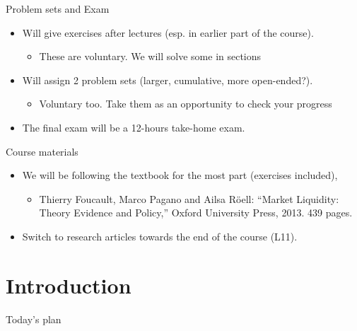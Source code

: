 \documentclass[english,10pt
,aspectratio=169
]{beamer}
\begin{document}
\begin{frame}{Problem sets and Exam}
\begin{itemize}
	\item Will give exercises after lectures (esp. in earlier part of the course).
	\begin{itemize}
		\item These are voluntary. We will solve some in sections
	\end{itemize}
	\item Will assign 2 problem sets (larger, cumulative, more open-ended?).
	\begin{itemize}
		\item Voluntary too. Take them as an opportunity to check your progress
	\end{itemize}
	\item The final exam will be a 12-hours take-home exam.
\end{itemize}
\end{frame}


\begin{frame}{Course materials}
\begin{itemize}
	\item We will be following the textbook for the most part (exercises included),
	\begin{itemize}
		\item Thierry Foucault, Marco Pagano and Ailsa R{\"o}ell: “Market Liquidity: Theory Evidence and Policy,” Oxford University Press, 2013. 439 pages.
	\end{itemize}
	\item Switch to research articles towards the end of the course (L11).
\end{itemize}
\end{frame}




\section{Introduction}

\begin{frame}{Today's plan}
\tableofcontents[currentsection]
\end{frame}


\end{document}
